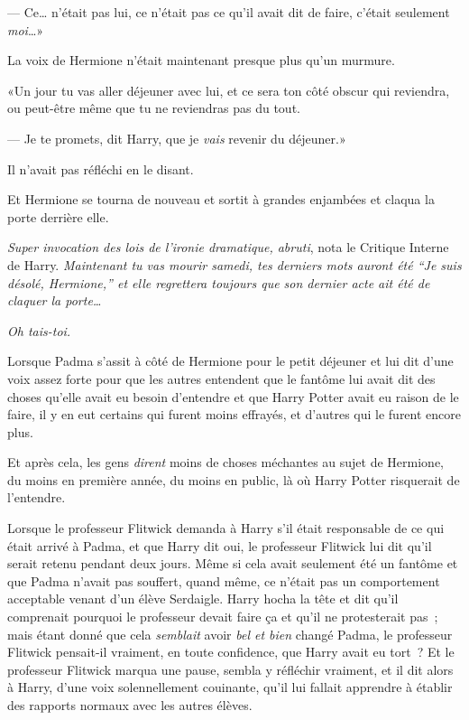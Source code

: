 --- Ce… n'était pas lui, ce n'était pas ce qu'il avait dit de faire, c'était seulement \emph{moi}…»

La voix de Hermione n'était maintenant presque plus qu'un murmure.

«Un jour tu vas aller déjeuner avec lui, et ce sera ton côté obscur qui reviendra, ou peut-être même que tu ne reviendras pas du tout.

--- Je te promets, dit Harry, que je \emph{vais} revenir du déjeuner.»

Il n'avait pas réfléchi en le disant.

Et Hermione se tourna de nouveau et sortit à grandes enjambées et claqua la porte derrière elle.

\emph{Super invocation des lois de l'ironie dramatique, abruti}, nota le Critique Interne de Harry. \emph{Maintenant tu vas mourir samedi, tes derniers mots auront été “Je suis désolé, Hermione,” et elle regrettera toujours que son dernier acte ait été de claquer la porte…}

\emph{Oh tais-toi.}

\later

Lorsque Padma s'assit à côté de Hermione pour le petit déjeuner et lui dit d'une voix assez forte pour que les autres entendent que le fantôme lui avait dit des choses qu'elle avait eu besoin d'entendre et que Harry Potter avait eu raison de le faire, il y en eut certains qui furent moins effrayés, et d'autres qui le furent encore plus.

Et après cela, les gens \emph{dirent} moins de choses méchantes au sujet de Hermione, du moins en première année, du moins en public, là où Harry Potter risquerait de l'entendre.

Lorsque le professeur Flitwick demanda à Harry s'il était responsable de ce qui était arrivé à Padma, et que Harry dit oui, le professeur Flitwick lui dit qu'il serait retenu pendant deux jours. Même si cela avait seulement été un fantôme et que Padma n'avait pas souffert, quand même, ce n'était pas un comportement acceptable venant d'un élève Serdaigle. Harry hocha la tête et dit qu'il comprenait pourquoi le professeur devait faire ça et qu'il ne protesterait pas~; mais étant donné que cela \emph{semblait} avoir \emph{bel et bien} changé Padma, le professeur Flitwick pensait-il vraiment, en toute confidence, que Harry avait eu tort~? Et le professeur Flitwick marqua une pause, sembla y réfléchir vraiment, et il dit alors à Harry, d'une voix solennellement couinante, qu'il lui fallait apprendre à établir des rapports normaux avec les autres élèves.

